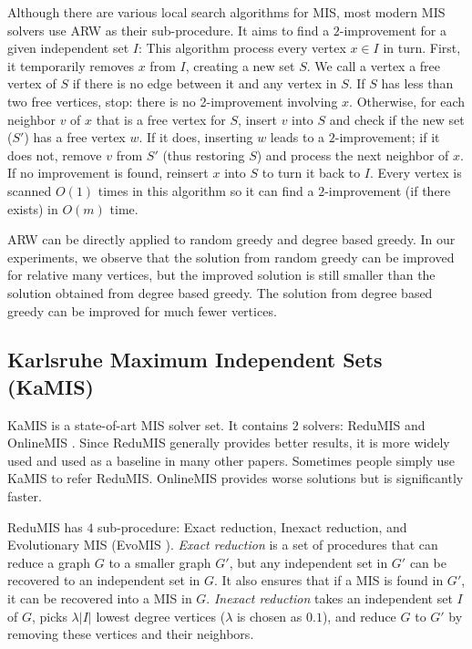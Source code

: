 Although there are various local search algorithms for MIS, most modern MIS solvers use ARW \cite{andrade2012fast} as their sub-procedure. It aims to find a $2$-improvement for a given independent set $I$: This algorithm process every vertex $x \in I$ in turn. First, it temporarily removes $x$ from $I$, creating a new set $S$. We call a vertex a free vertex of $S$ if there is no edge between it and any vertex in $S$. If $S$ has less than two free vertices, stop: there is no 2-improvement involving $x$. Otherwise, for each neighbor $v$ of $x$ that is a free vertex for $S$, insert $v$ into $S$ and check if the new set ($S'$) has a free vertex $w$. If it does, inserting $w$ leads to a $2$-improvement; if it does not, remove $v$ from $S'$ (thus restoring $S$) and process the next neighbor of $x$. If no improvement is found, reinsert $x$ into $S$ to turn it back to $I$. Every vertex is scanned $O(1)$ times in this algorithm so it can find a $2$-improvement (if there exists) in $O(m)$ time.

ARW can be directly applied to random greedy and degree based greedy. In our experiments, we observe that the solution from random greedy can be improved for relative many vertices, but the improved solution is still smaller than the solution obtained from degree based greedy. The solution from degree based greedy can be improved for much fewer vertices.
\subsection{Karlsruhe Maximum Independent Sets (KaMIS)}
KaMIS \cite{lamm2016finding} is a state-of-art MIS solver set. It contains $2$ solvers: ReduMIS \cite{lamm2016finding} and OnlineMIS \cite{dahlum2016accelerating}. Since ReduMIS generally provides better results, it is more widely used and used as a baseline in many other papers. Sometimes people simply use KaMIS to refer ReduMIS. OnlineMIS provides worse solutions but is significantly faster.

ReduMIS has $4$ sub-procedure: Exact reduction, Inexact reduction, and Evolutionary MIS (EvoMIS \cite{lamm2015graph}). \textit{Exact reduction} is a set of procedures that can reduce a graph $G$ to a smaller graph $G'$, but any independent set in $G'$ can be recovered to an independent set in $G$. It also ensures that if a MIS is found in $G'$, it can be recovered into a MIS in $G$. \textit{Inexact reduction} takes an independent set $I$ of $G$, picks $\lambda|I|$ lowest degree vertices ($\lambda$ is chosen as $0.1$), and reduce $G$ to $G'$ by removing these vertices and their neighbors.


